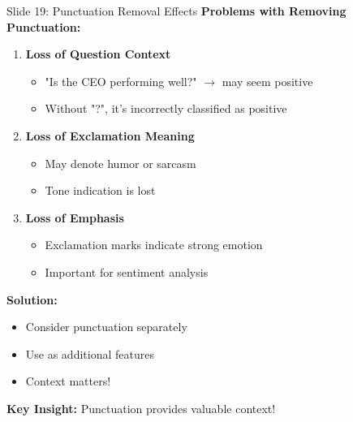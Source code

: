 \documentclass[8pt]{beamer}
\begin{document}
	\begin{frame}{Slide 19: Punctuation Removal Effects}
		\fontsize{6.5}{7.5}\selectfont
		\textbf{Problems with Removing Punctuation:}
		\begin{enumerate}
			\item \textbf{Loss of Question Context}
			\begin{itemize}
				\item "Is the CEO performing well?" $\to$ may seem positive
				\item Without "?", it's incorrectly classified as positive
			\end{itemize}
			\item \textbf{Loss of Exclamation Meaning}
			\begin{itemize}
				\item May denote humor or sarcasm
				\item Tone indication is lost
			\end{itemize}
			\item \textbf{Loss of Emphasis}
			\begin{itemize}
				\item Exclamation marks indicate strong emotion
				\item Important for sentiment analysis
			\end{itemize}
		\end{enumerate}
		
		\vspace{0.1cm}
		\textbf{Solution:}
		\begin{itemize}
			\item Consider punctuation separately
			\item Use as additional features
			\item Context matters!
		\end{itemize}
		
		\textcolor{myblue}{\textbf{Key Insight:}} Punctuation provides valuable context!
	\end{frame}
	
\end{document}
